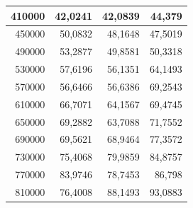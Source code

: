 \documentclass[a4paper, 12pt]{article}
\begin{document}
\begin{longtable}[c]{@{}rrrr@{}}
	\multicolumn{1}{|r|}{410000}                  & \multicolumn{1}{r|}{42,0241}                & \multicolumn{1}{r|}{42,0839}                & \multicolumn{1}{r|}{44,379}                 \\* \midrule
	\multicolumn{1}{|r|}{450000}                  & \multicolumn{1}{r|}{50,0832}                & \multicolumn{1}{r|}{48,1648}                & \multicolumn{1}{r|}{47,5019}                \\* \midrule
	\multicolumn{1}{|r|}{490000}                  & \multicolumn{1}{r|}{53,2877}                & \multicolumn{1}{r|}{49,8581}                & \multicolumn{1}{r|}{50,3318}                \\* \midrule
	\multicolumn{1}{|r|}{530000}                  & \multicolumn{1}{r|}{57,6196}                & \multicolumn{1}{r|}{56,1351}                & \multicolumn{1}{r|}{64,1493}                \\* \midrule
	\multicolumn{1}{|r|}{570000}                  & \multicolumn{1}{r|}{56,6466}                & \multicolumn{1}{r|}{56,6386}                & \multicolumn{1}{r|}{69,2543}                \\* \midrule
	\multicolumn{1}{|r|}{610000}                  & \multicolumn{1}{r|}{66,7071}                & \multicolumn{1}{r|}{64,1567}                & \multicolumn{1}{r|}{69,4745}                \\* \midrule
	\multicolumn{1}{|r|}{650000}                  & \multicolumn{1}{r|}{69,2882}                & \multicolumn{1}{r|}{63,7088}                & \multicolumn{1}{r|}{71,7552}                \\* \midrule
	\multicolumn{1}{|r|}{690000}                  & \multicolumn{1}{r|}{69,5621}                & \multicolumn{1}{r|}{68,9464}                & \multicolumn{1}{r|}{77,3572}                \\* \midrule
	\multicolumn{1}{|r|}{730000}                  & \multicolumn{1}{r|}{75,4068}                & \multicolumn{1}{r|}{79,9859}                & \multicolumn{1}{r|}{84,8757}                \\* \midrule
	\multicolumn{1}{|r|}{770000}                  & \multicolumn{1}{r|}{83,9746}                & \multicolumn{1}{r|}{78,7453}                & \multicolumn{1}{r|}{86,798}                 \\* \midrule
	\multicolumn{1}{|r|}{810000}                  & \multicolumn{1}{r|}{76,4008}                & \multicolumn{1}{r|}{88,1493}                & \multicolumn{1}{r|}{93,0883}                \\* \midrule

\end{longtable}
\end{document}
